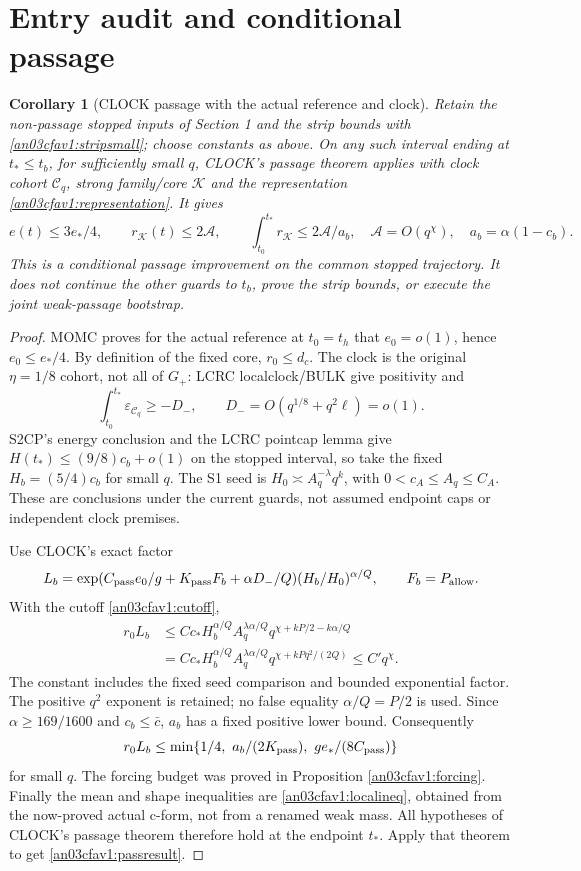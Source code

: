 \documentclass[11pt]{article}
\newtheorem{corollary}[theorem]{Corollary}
\theoremstyle{remark}\newtheorem{remark}[theorem]{Remark}
\newcommand{\KK}{\mathcal K}
\newcommand{\Gp}{G_+}
\newcommand{\eps}{\varepsilon}
\begin{document}
\section{Entry audit and conditional passage}
\begin{corollary}[CLOCK passage with the actual reference and clock]
\label{an03cfav1:passage}
Retain the non-passage stopped inputs of Section 1 and the
strip bounds with \eqref{an03cfav1:stripsmall}; choose constants
as above. On any such interval ending at $t_*\le t_b$, for
sufficiently small $q$, CLOCK's passage theorem applies with
clock cohort $\mathcal C_q$, strong family/core $\KK$ and
the representation \eqref{an03cfav1:representation}.
It gives
\begin{equation}
 e(t)\le3e_*/4,\qquad r_{\KK}(t)\le2\mathcal A,\qquad
 \int_{t_0}^{t_*}r_{\KK}\le2\mathcal A/a_b,
 \quad \mathcal A=O(q^\chi),\quad a_b=\alpha(1-c_b).
 \label{an03cfav1:passresult}
\end{equation}
This is a conditional passage improvement on the common
stopped trajectory. It does not continue the other guards
to $t_b$, prove the strip bounds, or execute the joint
weak-passage bootstrap.
\end{corollary}
\begin{proof}
MOMC proves for the actual reference at $t_0=t_h$ that
$e_0=o(1)$, hence $e_0\le e_*/4$.
By definition of the fixed core, $r_0\le d_c$.
The clock is the original $\eta=1/8$ cohort, not all of
$\Gp$: LCRC localclock/BULK give positivity and
\[
 \int_{t_0}^{t_*}\eps_{\mathcal C_q}
       \ge-D_-,\qquad D_-=O(q^{1/8}+q^2\ell)=o(1).
 \]
S2CP's energy conclusion and the LCRC pointcap lemma
give $H(t_*)\le(9/8)c_b+o(1)$ on the stopped interval,
so take the fixed $H_b=(5/4)c_b$ for small $q$.
The S1 seed is
$H_0\asymp A_q^{-\lambda}q^k$, with
$0<c_A\le A_q\le C_A$.
These are conclusions under the current guards, not
assumed endpoint caps or independent clock premises.

Use CLOCK's exact factor
\[
 L_b=\exp(C_{\rm pass}e_0/g+K_{\rm pass}F_b+\alpha D_-/Q)
                      (H_b/H_0)^{\alpha/Q},
 \qquad F_b=P_{\rm allow}.
 \]
With the cutoff \eqref{an03cfav1:cutoff},
\begin{align}
 r_0L_b
 &\le Cc_*H_b^{\alpha/Q}A_q^{\lambda\alpha/Q}
        q^{\chi+kP/2-k\alpha/Q}\nonumber\\
 &=Cc_*H_b^{\alpha/Q}A_q^{\lambda\alpha/Q}
        q^{\chi+kPq^2/(2Q)}
 \le C' q^\chi.
 \label{an03cfav1:handoff}
\end{align}
The constant includes the fixed seed comparison and bounded
exponential factor. The positive $q^2$ exponent is retained;
no false equality $\alpha/Q=P/2$ is used.
Since $\alpha\ge169/1600$ and $c_b\le\bar c$,
$a_b$ has a fixed positive lower bound. Consequently
\[
 r_0L_b\le
 \min\{1/4,\ a_b/(2K_{\rm pass}),\
                        ge_*/(8C_{\rm pass})\}
 \]
for small $q$. The forcing budget was proved in
Proposition \ref{an03cfav1:forcing}. Finally the mean and
shape inequalities are \eqref{an03cfav1:localineq}, obtained
from the now-proved actual c-form, not from a renamed weak
mass. All hypotheses of CLOCK's passage theorem therefore
hold at the endpoint $t_*$. Apply that theorem to get
\eqref{an03cfav1:passresult}.
\end{proof}
\end{document}
